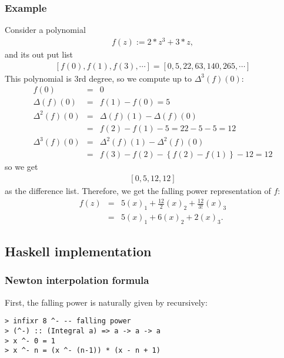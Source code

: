 \documentclass[11pt]{book}
\begin{document}
\subsubsection{Example}
Consider a polynomial
\begin{eqnarray}
f(z) := 2*z^3+3*z,
\end{eqnarray}
and its out put list
\begin{eqnarray}
\left[ f(0), f(1), f(3), \cdots\right] = \left[0,5,22,63,140,265, \cdots \right]
\end{eqnarray}
This polynomial is 3rd degree, so we compute up to $\Delta^3(f)(0)$:
\begin{eqnarray}
f(0) &=& 0 \\
\Delta(f)(0) &=& f(1) - f(0) = 5\\
\nonumber
\Delta^2(f)(0) &=& \Delta(f)(1) - \Delta(f)(0) \\
&=& f(2) - f(1) - 5 = 22 -5 -5= 12 \\
\nonumber
\Delta^3(f)(0) &=& \Delta^2(f)(1) - \Delta^2(f)(0) \\
&=& f(3)-f(2) - \left\{ f(2) - f(1)\right\} - 12 = 12
\end{eqnarray}
so we get
\begin{eqnarray}
\label{exOfDiff}
\left[0,5,12,12\right]
\end{eqnarray}
as the difference list.
Therefore, we get the falling power representation of $f$:
\begin{eqnarray}
f(z) &=& 5(x)_1 + \frac{12}{2}(x)_2 + \frac{12}{3!}(x)_3 \\
\label{exOfNewton} &=&  5(x)_1 + 6(x)_2 + 2(x)_3.
\end{eqnarray}

\subsection{Haskell implementation}
\subsubsection{Newton interpolation formula}
First, the falling power is naturally given by recursively:
\begin{verbatim}
> infixr 8 ^- -- falling power
> (^-) :: (Integral a) => a -> a -> a
> x ^- 0 = 1
> x ^- n = (x ^- (n-1)) * (x - n + 1)
\end{verbatim}
\end{document}
